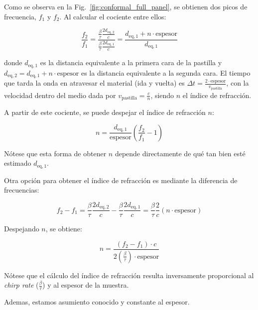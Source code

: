 Como se observa en la Fig.~\ref{fig:conformal_full_panel}, se obtienen dos picos de frecuencia, $f_1$ y $f_2$. Al calcular el cociente entre ellos:

\begin{equation}
    \frac{f_2}{f_1} = \frac{\frac{\beta}{\tau} \frac{2 d_{\text{eq}, 2}}{c}}{\frac{\beta}{\tau} \frac{2 d_{\text{eq}, 1}}{c}} = \frac{d_{\text{eq}, 1} + n \cdot \text{espesor}}{d_{\text{eq}, 1}}
\end{equation}

donde $d_{\text{eq}, 1}$ es la distancia equivalente a la primera cara de la pastilla y $d_{\text{eq}, 2} = d_{\text{eq}, 1} + n \cdot \text{espesor}$ es la distancia equivalente a la segunda cara. El tiempo que tarda la onda en atravesar el material (ida y vuelta) es $\Delta t = \frac{2 \cdot \text{espesor}}{v_{\text{pastilla}}}$, con la velocidad dentro del medio dada por $v_{\text{pastilla}} = \frac{c}{n}$, siendo $n$ el índice de refracción.

A partir de este cociente, se puede despejar el índice de refracción $n$:

\begin{equation}
    n = \frac{d_{\text{eq}, 1}}{\text{espesor}} \left( \frac{f_2}{f_1} - 1 \right)
    \label{eq:coef_cociente}
\end{equation}

Nótese que esta forma de obtener $n$ depende directamente de qué tan bien esté estimado $d_{\text{eq}, 1}$.

Otra opción para obtener el índice de refracción es mediante la diferencia de frecuencias:

\begin{equation}
    f_2 - f_1 = \frac{\beta}{\tau} \frac{2 d_{\text{eq}, 2}}{c} - \frac{\beta}{\tau} \frac{2 d_{\text{eq}, 1}}{c} = \frac{\beta}{\tau} \frac{2}{c} \left( n \cdot \text{espesor} \right)
\end{equation}

Despejando $n$, se obtiene:

\begin{equation}
    n = \frac{(f_2 - f_1) \cdot c}{2 \left( \frac{\beta}{\tau} \right) \cdot \text{espesor}}
\end{equation}

Nótese que el cálculo del índice de refracción resulta inversamente proporcional al \textit{chirp rate} ($\frac{\beta}{\tau}$) y al espesor de la muestra.

Ademas, estamos asumiento conocido y constante al espesor.


